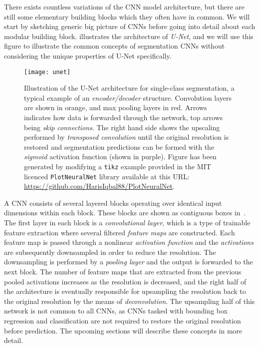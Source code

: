 There exists countless variations of the CNN model architecture, but there are still some elementary building blocks which they often have in common.
We will start by sketching generic big picture of CNNs before going into detail about each modular building block.
 illustrates the architecture of \textit{U-Net}, and we will use this figure to illustrate the common concepts of segmentation CNNs without considering the unique properties of U-Net specifically.

\begin{figure}[H]
  \texttt{[image: unet]}
  \caption{%
    Illustration of the U-Net architecture for single-class segmentation, a typical example of an \textit{encoder/decoder} structure.
    Convolution layers are shown in orange, and max pooling layers in red.
    Arrows indicates how data is forwarded through the network, top arrows being \textit{skip connections}.
    The right hand side shows the upscaling performed by \textit{transposed convolution} until the original resolution is restored and segmentation predictions can be formed with the \textit{sigmoid} activation function (shown in purple).
    Figure has been generated by modifying a \texttt{tikz} example provided in the MIT licenced \texttt{PlotNeuralNet} library available at this URL:\@ \\ %
    \protect\url{https://github.com/HarisIqbal88/PlotNeuralNet}.
  }%
  \label{fig:unet}
\end{figure}

A CNN consists of several layered blocks operating over identical input dimensions within each block.
These blocks are shown as contiguous boxes in~.
The first layer in each block is a \textit{convolutional layer}, which is a type of trainable feature extraction where several filtered \textit{feature maps} are constructed.
Each feature map is passed through a nonlinear \textit{activation function} and the \textit{activations} are subsequently downsampled in order to reduce the resolution.
The downsampling is performed by a \textit{pooling layer} and the output is forwarded to the next block.
The number of feature maps that are extracted from the previous pooled activations increases as the resolution is decreased, and the right half of the architecture is eventually responsible for upsampling the resolution back to the original resolution by the means of \textit{deconvolution}.
The upsampling half of this network is not common to all CNNs, as CNNs tasked with bounding box regression and classification are not required to restore the original resolution before prediction.
The upcoming sections will describe these concepts in more detail.
